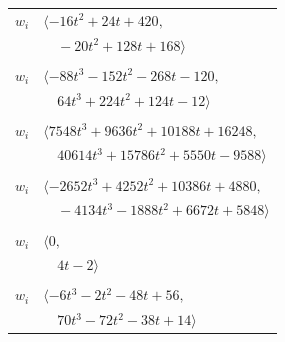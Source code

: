\documentclass[11pt]{article}
\begin{document}
\begin{longtable}{@{}ll@{}}
$w_i$ & $\langle -16t^{2}+24t+420,$\\
 & $\quad -20t^{2}+128t+168\rangle$\\
\addlinespace[2pt]
\multicolumn{2}{@{}p{0.97\textwidth}@{}}{$i=55$, $D_i=4$, $\rho_{ij}$: $5{:}1, \allowbreak 26{:}1, \allowbreak 35{:}1, \allowbreak 41{:}1, \allowbreak 49{:}2, \allowbreak 50{:}2$}\\
$w_i$ & $\langle -88t^{3}-152t^{2}-268t-120,$\\
 & $\quad 64t^{3}+224t^{2}+124t-12\rangle$\\
\addlinespace[2pt]
\multicolumn{2}{@{}p{0.97\textwidth}@{}}{$i=56$, $D_i=512$, $\rho_{ij}$: $5{:}1, \allowbreak 7{:}1, \allowbreak 9{:}2, \allowbreak 26{:}1, \allowbreak 32{:}2, \allowbreak 37{:}2, \allowbreak 38{:}2, \allowbreak 39{:}1, \allowbreak 40{:}1, \allowbreak 41{:}2, \allowbreak 42{:}1, \allowbreak 48{:}1, \allowbreak 50{:}2, \allowbreak 62{:}2$}\\
$w_i$ & $\langle 7548t^{3}+9636t^{2}+10188t+16248,$\\
 & $\quad 40614t^{3}+15786t^{2}+5550t-9588\rangle$\\
\addlinespace[2pt]
\multicolumn{2}{@{}p{0.97\textwidth}@{}}{$i=57$, $D_i=16$, $\rho_{ij}$: $10{:}2, \allowbreak 11{:}2, \allowbreak 21{:}2, \allowbreak 26{:}1, \allowbreak 30{:}1, \allowbreak 32{:}2, \allowbreak 33{:}2, \allowbreak 36{:}1, \allowbreak 40{:}1, \allowbreak 49{:}1, \allowbreak 54{:}2, \allowbreak 59{:}2, \allowbreak 64{:}1, \allowbreak 67{:}1$}\\
$w_i$ & $\langle -2652t^{3}+4252t^{2}+10386t+4880,$\\
 & $\quad -4134t^{3}-1888t^{2}+6672t+5848\rangle$\\
\addlinespace[2pt]
\multicolumn{2}{@{}p{0.97\textwidth}@{}}{$i=58$, $D_i=2$, $\rho_{ij}$: $1{:}2, \allowbreak 5{:}2, \allowbreak 50{:}1, \allowbreak 54{:}2, \allowbreak 61{:}2$}\\
$w_i$ & $\langle 0,$\\
 & $\quad 4t-2\rangle$\\
\addlinespace[2pt]
\multicolumn{2}{@{}p{0.97\textwidth}@{}}{$i=59$, $D_i=4$, $\rho_{ij}$: $1{:}1, \allowbreak 4{:}1, \allowbreak 5{:}1, \allowbreak 10{:}1, \allowbreak 16{:}1, \allowbreak 20{:}1, \allowbreak 33{:}1, \allowbreak 39{:}1, \allowbreak 40{:}2, \allowbreak 45{:}2, \allowbreak 50{:}1, \allowbreak 57{:}1$}\\
$w_i$ & $\langle -6t^{3}-2t^{2}-48t+56,$\\
 & $\quad 70t^{3}-72t^{2}-38t+14\rangle$\\

\end{longtable}
\end{document}
